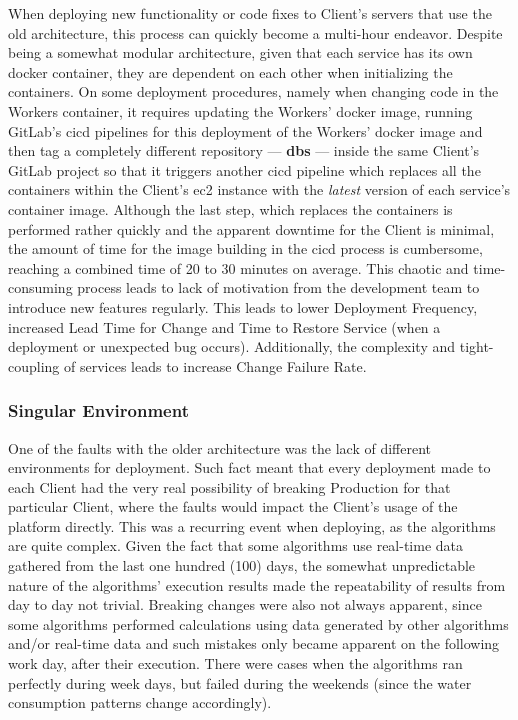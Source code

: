 When deploying new functionality or code fixes to Client's servers that use the old architecture, this process can quickly become a multi-hour endeavor. Despite being a somewhat modular architecture, given that each service has its own docker container, they are dependent on each other when initializing the containers. On some deployment procedures, namely when changing code in the Workers container, it requires updating the Workers' docker image, running GitLab's \gls{cicd} pipelines for this deployment of the Workers' docker image and then tag a completely different repository —  \textbf{dbs} — inside the same Client's GitLab project so that it triggers another \gls{cicd} pipeline which replaces all the containers within the Client's \gls{ec2} instance with the \textit{latest} version of each service's container image. Although the last step, which replaces the containers is performed rather quickly and the apparent downtime for the Client is minimal, the amount of time for the image building in the \gls{cicd} process is cumbersome, reaching a combined time of 20 to 30 minutes on average. This chaotic and time-consuming process leads to lack of motivation from the development team to introduce new features regularly. This leads to lower Deployment Frequency, increased Lead Time for Change and Time to Restore Service (when a deployment or unexpected bug occurs). Additionally, the complexity and tight-coupling of services leads to increase Change Failure Rate. 

\subsubsection{Singular Environment}\label{methodology:sss:singular-environment}

One of the faults with the older architecture was the lack of different environments for deployment. Such fact meant that every deployment made to each Client had the very real possibility of breaking Production for that particular Client, where the faults would impact the Client's usage of the platform directly. This was a recurring event when deploying, as the algorithms are quite complex. Given the fact that some algorithms use real-time data gathered from the last one hundred (100) days, the somewhat unpredictable nature of the algorithms' execution results made the repeatability of results from day to day not trivial.
Breaking changes were also not always apparent, since some algorithms performed calculations using data generated by other algorithms and/or real-time data and such mistakes only became apparent on the following work day, after their execution. There were cases when the algorithms ran perfectly during week days, but failed during the weekends (since the water consumption patterns change accordingly).

